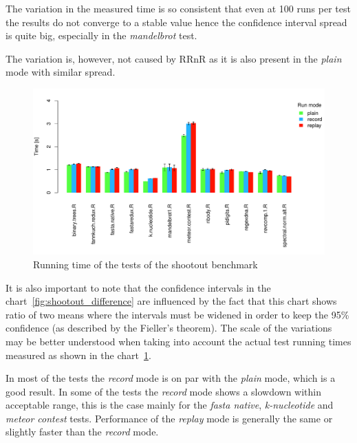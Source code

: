 \documentclass[thesis=M,english,hidelinks]{FITthesis}[2012/10/20]
\begin{document}
		The variation in the measured time is so consistent that even at 100 runs per test the results do not converge to a stable value hence the confidence interval spread is quite big, especially in the \emph{mandelbrot} test.\par
		
		The variation is, however, not caused by RRnR as it is also present in the \emph{plain} mode with similar spread.\par
		
		\begin{figure}[ht]\centering
			\includegraphics[width=1.0\textwidth]{benchmarks/shootout/plot_running_time}
			\caption{Running time of the tests of the shootout benchmark}\label{fig:shootout_running}
		\end{figure}
		\FloatBarrier
		
		It is also important to note that the confidence intervals in the chart~\ref{fig:shootout_difference} are influenced by the fact that this chart shows ratio of two means where the intervals must be widened in order to keep the 95\% confidence (as described by the Fieller's theorem). The scale of the variations may be better understood when taking into account the actual test running times measured as shown in the chart~\ref{fig:shootout_running}.\par
		
		In most of the tests the \emph{record} mode is on par with the \emph{plain} mode, which is a good result. In some of the tests the \emph{record} mode shows a slowdown within acceptable range, this is the case mainly for the \emph{fasta native}, \emph{k-nucleotide} and \emph{meteor contest} tests. Performance of the \emph{replay} mode is generally the same or slightly faster than the \emph{record} mode.\par
		
\end{document}
